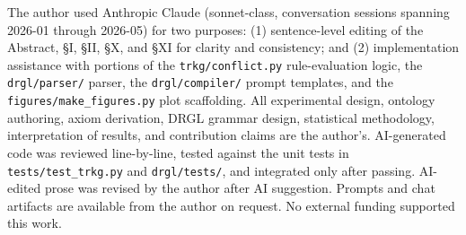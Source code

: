 \documentclass{ieeeaccess}
\begin{document}
The author used Anthropic Claude (sonnet-class, conversation sessions spanning 2026-01 through 2026-05) for two purposes: (1) sentence-level editing of the Abstract, §I, §II, §X, and §XI for clarity and consistency; and (2) implementation assistance with portions of the \texttt{trkg/conflict.py} rule-evaluation logic, the \texttt{drgl/parser/} parser, the \texttt{drgl/compiler/} prompt templates, and the \texttt{figures/make\_figures.py} plot scaffolding. All experimental design, ontology authoring, axiom derivation, DRGL grammar design, statistical methodology, interpretation of results, and contribution claims are the author's. AI-generated code was reviewed line-by-line, tested against the unit tests in \texttt{tests/test\_trkg.py} and \texttt{drgl/tests/}, and integrated only after passing. AI-edited prose was revised by the author after AI suggestion. Prompts and chat artifacts are available from the author on request. No external funding supported this work.
\end{document}
